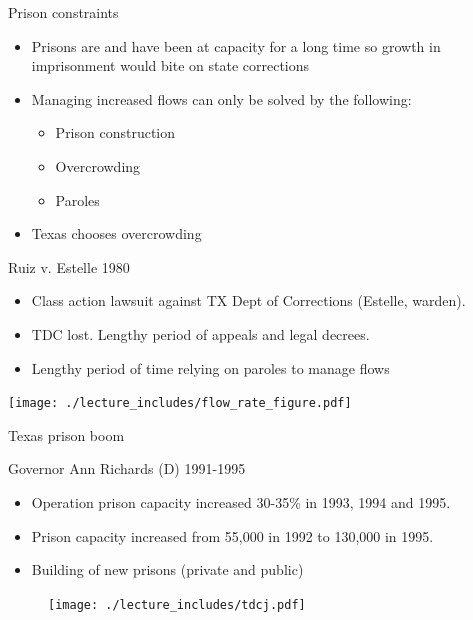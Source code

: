 \documentclass{beamer}
\begin{document}
\begin{frame}{Prison constraints}

	
	\begin{itemize}
	\item Prisons are and have been at capacity for a long time so growth in imprisonment would bite on state corrections
	\item Managing increased flows can only be solved by the following:
		\begin{itemize}
		\item Prison construction
		\item Overcrowding
		\item Paroles
		\end{itemize}
	\item Texas chooses overcrowding
	\end{itemize}
\end{frame}



\begin{frame}{Ruiz v. Estelle 1980}

	
	\begin{itemize}
		\item Class action lawsuit against TX Dept of Corrections (Estelle, warden). 
		\item TDC lost.  Lengthy period of appeals and legal decrees.  
		\item Lengthy period of time relying on paroles to manage flows
	\end{itemize}
\end{frame}


\texttt{[image: ./lecture\_includes/flow\_rate\_figure.pdf]}


\begin{frame}{Texas prison boom}

Governor Ann Richards (D) 1991-1995
		\begin{itemize}
		\item Operation prison capacity increased 30-35\% in 1993, 1994 and 1995. 
		\item Prison capacity increased from 55,000 in 1992 to 130,000 in 1995.  
		\item Building of new prisons (private and public)
		\end{itemize} 
\end{frame}


\begin{frame}[shrink=30,plain]

\begin{figure}
\texttt{[image: ./lecture\_includes/tdcj.pdf]}
\end{figure}
\end{frame}
\end{document}
